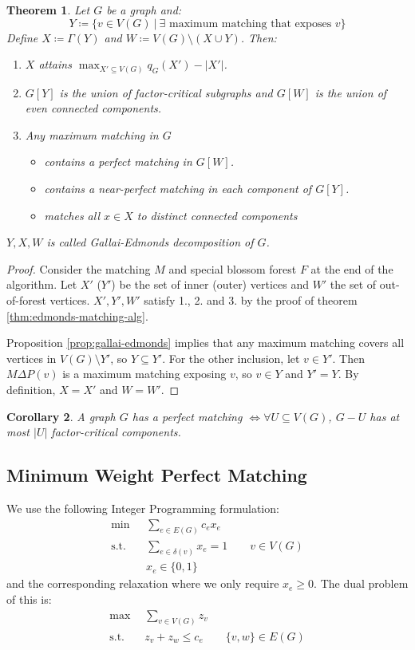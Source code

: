 \documentclass[11pt, a4paper]{article}
\newcommand{\abs}[1]{\left\lvert#1\right\rvert}
\newcommand{\set}[1]{\{#1\}}
\newtheorem{theorem}{Theorem}[section]
\newtheorem{cor}[theorem]{Corollary}
\theoremstyle{remark}
\theoremstyle{definition}
\begin{document}
\begin{theorem}
	Let $G$ be a graph and:
	\[
		Y\coloneqq\set{v\in V(G)\ |\
			\exists \text{ maximum matching that exposes } v}
	\]
	Define $X\coloneqq\Gamma(Y)$ and $W\coloneqq V(G)\setminus
		\left(X\cup Y\right)$. Then:
	\begin{enumerate}
		\item $X$ attains $\max_{X'\subseteq V(G)}q_G(X')-\abs{X'}$.
		\item $G[Y]$ is the union of factor-critical subgraphs and
		$G[W]$ is the union of even connected components.
		\item Any maximum matching in $G$
		\begin{itemize}
			\item contains a perfect matching in $G[W]$.
			\item contains a near-perfect matching in each component of $G[Y]$.
			\item matches all $x\in X$ to distinct connected components
		\end{itemize}
	\end{enumerate}
	$Y,X,W$ is called \emph{Gallai-Edmonds decomposition} of $G$.
\end{theorem}
\begin{proof}
	Consider the matching $M$ and special blossom forest $F$ at the end
	of the algorithm. Let $X'$ ($Y'$) be the set of inner (outer) vertices
	and $W'$ the set of out-of-forest vertices. $X',Y',W'$ satisfy 1., 2.
	and 3. by the proof of theorem \ref{thm:edmonds-matching-alg}.

	Proposition \ref{prop:gallai-edmonds} implies that any maximum
	matching covers all vertices in $V(G)\setminus Y'$, so $Y\subseteq
		Y'$. For the other inclusion, let $v\in Y'$. Then $M\Delta P(v)$ is a
	maximum matching exposing $v$, so $v\in Y$ and $Y'=Y$. By definition,
	$X=X'$ and $W=W'$.
\end{proof}

\begin{cor}
	A graph $G$ has a perfect matching $\Leftrightarrow \forall U\subseteq V(G)$,
	$G-U$ has at most $\abs{U}$ factor-critical components.
\end{cor}


\subsection{Minimum Weight Perfect Matching}
We use the following Integer Programming formulation:
\begin{align*}
	\min             & \sum_{e\in E(G)}c_ex_e                     \\
	\text{s.t.}\quad & \sum_{e\in\delta(v)}x_e=1 \qquad v\in V(G) \\
	                 & x_e\in\set{0,1}
\end{align*}
and the corresponding relaxation where we only require $x_e\geq0$. The
dual problem of this is:
\begin{align*}
	\max             & \sum_{v\in V(G)}z_v                      \\
	\text{s.t.}\quad & z_v+z_w\leq c_e \qquad \set{v,w}\in E(G)
\end{align*}
\end{document}
